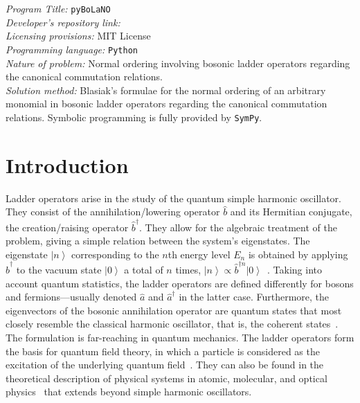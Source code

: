 \documentclass[onecolumn, 12pt, sort&compress]{elsarticle}
\newcommand{\ket}[1]{\left|{#1}\right\rangle}
\newcommand{\bop}{\hat{b}}
\newcommand{\bdag}{\bop^\dagger}
\newenvironment{revision}{}{}
\begin{document}


\begin{small}
\noindent
{\em Program Title:} \texttt{pyBoLaNO}
\\
{\em Developer's repository link:} \href{https://github.com/hendry24/pyBoLaNO}{}
\\
{\em Licensing provisions:} MIT License
\\
{\em Programming language:} \texttt{Python}
\\
{\em Nature of problem:} Normal ordering involving bosonic ladder operators \begin{revision} regarding the canonical commutation relations. \end{revision}
\\
{\em Solution method:} Blasiak's formulae for the normal ordering of an arbitrary monomial in bosonic ladder operators \begin{revision}regarding the canonical commutation relations.\end{revision} Symbolic programming is fully provided by \texttt{SymPy}.
\end{small}


\section{Introduction}
\label{Introduction}

Ladder operators arise in the study of the quantum simple harmonic oscillator. They consist of the annihilation/lowering operator $\bop$ and its Hermitian conjugate, the creation/raising operator $\bdag$. They allow for the algebraic treatment of the problem, giving a simple relation between the system's eigenstates. The eigenstate $\ket{n}$ corresponding to the $n$th energy level $E_n$ is obtained by applying $\hat{b}^\dagger$ to the vacuum state $\ket{0}$ a total of $n$ times, $\ket{n}\propto\hat{b}^{\dagger n}\ket{0}$~\cite{griffiths_introduction_2018, lancaster_quantum_2014}. Taking into account quantum statistics, the ladder operators are defined differently for bosons and fermions---usually denoted $\hat{a}$ and $\hat{a}^\dagger$ in the latter case. Furthermore, the eigenvectors of the bosonic annihilation operator are quantum states that most closely resemble the classical harmonic oscillator, that is, the coherent states~\cite{gerry_introductory_2005}. The formulation is far-reaching in quantum mechanics. The ladder operators form the basis for quantum field theory, in which a particle is considered as the excitation of the underlying quantum field~\cite{lancaster_quantum_2014}. They can also be found in the theoretical description of physical systems in atomic, molecular, and optical physics~\cite{gerry_introductory_2005} that extends beyond simple harmonic oscillators.
\end{document}
